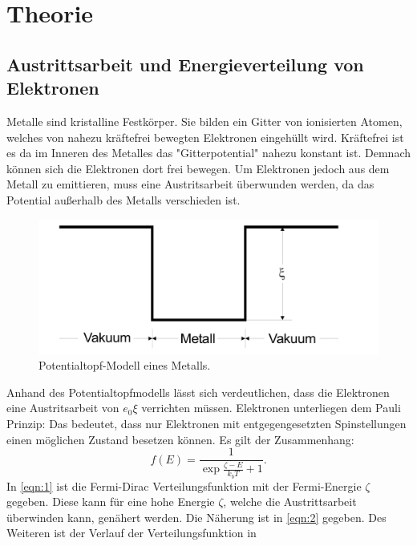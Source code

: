 \section{Theorie}
\label{sec:Theorie}

\subsection{Austrittsarbeit und Energieverteilung von Elektronen}
Metalle sind kristalline Festkörper. Sie bilden ein Gitter von 
ionisierten Atomen, welches von nahezu kräftefrei bewegten Elektronen 
eingehüllt wird. Kräftefrei ist es da im Inneren des Metalles das "Gitterpotential"
nahezu konstant ist. Demnach können sich die Elektronen dort frei bewegen. Um Elektronen jedoch 
aus dem Metall zu emittieren, muss eine Austritsarbeit überwunden werden, da das Potential außerhalb 
des Metalls verschieden ist.
\begin{figure}[H]
    \centering
        \centering
        \includegraphics[width=\textwidth]{Bilder/potentialtopf.jpg}
        \caption{Potentialtopf-Modell eines Metalls. \cite{anleitung4}}
    \hfill
    \label{fig:phasendiagramm}
\end{figure}
\noindent Anhand des Potentialtopfmodells lässt sich verdeutlichen, dass die
Elektronen eine Austritsarbeit von $e_0 \xi$ verrichten müssen.
\noindent Elektronen unterliegen dem Pauli Prinzip: Das bedeutet, dass nur Elektronen mit
entgegengesetzten Spinstellungen einen möglichen Zustand besetzen können.
Es gilt der Zusammenhang:
\begin{equation}
    \label{eqn:1}
    f\left(E\right) = \frac{1}{\exp{\frac{\zeta-E}{k_b T} + 1}}.
\end{equation}
\noindent In \autoref{eqn:1} ist die Fermi-Dirac Verteilungsfunktion mit der Fermi-Energie
$\zeta$ gegeben. Diese kann für eine hohe Energie $\zeta$, welche die Austrittsarbeit überwinden kann,
genähert werden. Die Näherung ist in \autoref{eqn:2} 
gegeben. Des Weiteren ist der Verlauf der Verteilungsfunktion in 
